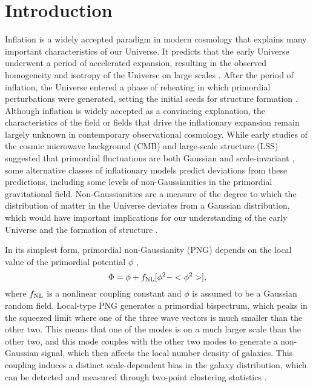 \section{Introduction}
\label{sec:introduction}

Inflation is a widely accepted paradigm in modern cosmology that explains many important characteristics of our Universe. It predicts that the early Universe underwent a period of accelerated expansion, resulting in the observed homogeneity and isotropy of the Universe on large scales \citep[see, e.g.,][for a review]{weinberg2013observational}. After the period of inflation, the Universe entered a phase of reheating in which primordial perturbations were generated, setting the initial seeds for structure formation \citep{kofman1994reheating, bassett2006inflation, lyth2009primordial}. Although inflation is widely accepted as a convincing explanation, the characteristics of the field or fields that drive the inflationary expansion remain largely unknown in contemporary observational cosmology. While early studies of the cosmic microwave background (CMB) and large-scale structure (LSS) suggested that primordial fluctuations are both Gaussian and scale-invariant \citep{PhysRevD.69.103501, guth2005inflationary}, some alternative classes of inflationary models predict deviations from these predictions, including some levels of non-Gaussianities in the primordial gravitational field. Non-Gaussianities are a measure of the degree to which the distribution of matter in the Universe deviates from a Gaussian distribution, which would have important implications for our understanding of the early Universe and the formation of structure \citep[see, e.g.,][]{2010CQGra..27l4011D, Biagetti2019Galax...7...71B}.

In its simplest form, primordial non-Gaussianity (PNG) depends on the local value of the primordial potential $\phi$ \citep{komatsu2001acoustic},
\begin{equation}
 \Phi = \phi + f_{\rm NL} [\phi^{2} - <\phi^{2}>],
\end{equation}
where $f_{\rm NL}$ is a nonlinear coupling constant and $\phi$ is assumed to be a Gaussian random field. Local-type PNG generates a primordial bispectrum, which peaks in the squeezed limit where one of the three wave vectors is much smaller than the other two. This means that one of the modes is on a much larger scale than the other two, and this mode couples with the other two modes to generate a non-Gaussian signal, which then affects the local number density of galaxies. This coupling induces a distinct scale-dependent bias in the galaxy distribution, which can be detected and measured through two-point clustering statistics \citep{dalal2008imprints}.

